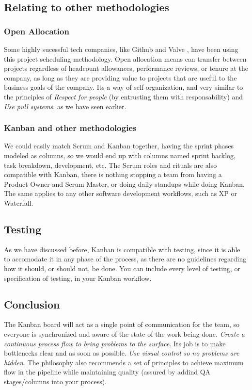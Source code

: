 \documentclass[conference]{IEEEtran}
\begin{document}
\subsection{Relating to other methodologies}
\subsubsection{Open Allocation}
Some highly sucessful tech companies, like Github and Valve \cite{openalloc}, have been using
this project scheduling methodology. Open allocation means can transfer between
projects regardless of headcount allowances, performance reviews, or tenure at
the company, as long as they are providing value to projects that are useful to
the business goals of the company. Its a way of self-organization, and very
similar to the principles of \textit{Respect for people} (by entrusting them
with responsability) and \textit{Use pull systems}, as we have seen earlier.
\subsubsection{Kanban and other methodologies}
We could easily match Scrum and Kanban together, having the sprint phases modeled
as columns, so we would end up with columns named sprint backlog, task breakdown,
development, etc. The Scrum roles and rituals are also compatible with Kanban,
there is nothing stopping a team from having a Product Owner and Scrum Master,
or doing daily standups while doing Kanban.
The same applies to any other software development workflows, such
as XP or Waterfall.

\subsection{Testing}
As we have discussed before, Kanban is compatible with testing, since it is able to
accomodate it in any phase of the process, as there are no guidelines regarding how it should, or should not, be done.
You can include every level of testing, or specification of testing, in your Kanban
workflow.

\subsection{Conclusion} %
The Kanban board will act as a single point of communication for the
team, so everyone is synchronized and aware of the state of the work being done.
\textit{Create a continuous process flow to bring problems to the surface}.
Its job is to make bottlenecks clear and as soon as possible. \textit{Use visual control so no problems are hidden}.
The philosophy also recommends a set of principles to achieve maximum flow in the
pipeline while maintaining quality (assured by addind QA stages/columns into your process).
\end{document}
